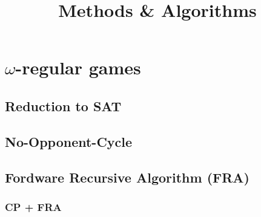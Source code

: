 \documentclass{article}
\begin{document}
\title{Methods \& Algorithms}
\author{}
\date{}

\maketitle

\section{$\omega$-regular games}
\subsection{Reduction to SAT}

\subsection{No-Opponent-Cycle}
% 


\pagebreak

\pagebreak

% 
% 

\subsection{Fordware Recursive Algorithm (FRA)}
\subsubsection{CP + FRA}
% 

\end{document}
